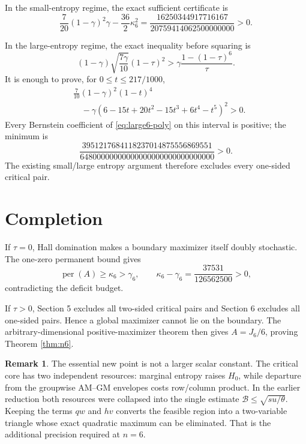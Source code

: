 \documentclass[11pt]{article}
\theoremstyle{definition}
\newtheorem{remark}[theorem]{Remark}
\newcommand{\per}{\operatorname{per}}
\begin{document}
In the small-entropy regime, the exact sufficient certificate is
\[
 \frac7{20}(1-\gamma)^2\gamma-\frac{36}{2}\kappa_6^2
 =\frac{16250344917716167}
 {20759414062500000000}>0.
 \tag{6.3}\label{eq:small6}
\]

In the large-entropy regime, the exact inequality before squaring is
\[
 (1-\gamma)\sqrt{\frac{7\gamma}{10}}
 (1-\tau)^2
 >
 \gamma\frac{1-(1-\tau)^6}{\tau}.
 \tag{6.4}\label{eq:large-before-square}
\]
It is enough to prove, for $0\le t\le217/1000$,
\[
 \begin{aligned}
 &\frac7{10}(1-\gamma)^2(1-t)^4\\
 &\quad-\gamma
 (6-15t+20t^2-15t^3+6t^4-t^5)^2>0.
 \end{aligned}
 \tag{6.5}\label{eq:large6-poly}
\]
Every Bernstein coefficient of \eqref{eq:large6-poly} on this interval is
positive; the minimum is
\[
 \frac{3951217684118237014875556869551}
 {64800000000000000000000000000000}>0.
 \tag{6.6}\label{eq:large6-min}
\]
The existing small/large entropy argument therefore excludes every one-sided
critical pair.

\section{Completion}

If $\tau=0$, Hall domination makes a boundary maximizer itself doubly
stochastic.  The one-zero permanent bound gives
\[
 \per(A)\ge\kappa_6>\gamma_6,
 \qquad
 \kappa_6-\gamma_6=\frac{37531}{126562500}>0,
\]
contradicting the deficit budget.

If $\tau>0$, Section 5 excludes all two-sided critical pairs and Section 6
excludes all one-sided pairs.  Hence a global maximizer cannot lie on the
boundary.  The arbitrary-dimensional positive-maximizer theorem then gives
$A=J_6/6$, proving Theorem \ref{thm:n6}.

\begin{remark}
The essential new point is not a larger scalar constant.  The critical core
has two independent resources: marginal entropy raises $H_0$, while departure
from the groupwise AM--GM envelopes costs row/column product.  In the earlier
reduction both resources were collapsed into the single estimate
$\mathcal B\le\sqrt{su/\theta}$.  Keeping the terms $qw$ and $hv$ converts the
feasible region into a two-variable triangle whose exact quadratic maximum can
be eliminated.  That is the additional precision required at $n=6$.
\end{remark}
\end{document}

